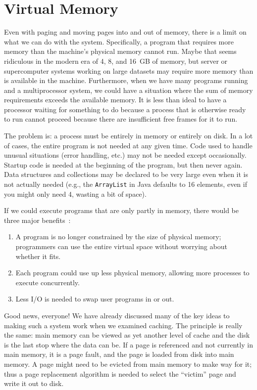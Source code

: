 




\section*{Virtual Memory}
Even with paging and moving pages into and out of memory, there is a limit on what we can do with the system. Specifically, a program that requires more memory than the machine's physical memory cannot run. Maybe that seems ridiculous in the modern era of 4, 8, and 16~GB of memory, but server or supercomputer systems working on large datasets may require more memory than is available in the machine. Furthermore, when we have many programs running and a multiprocessor system, we could have a situation where the sum of memory requirements exceeds the available memory. It is less than ideal to have a processor waiting for something to do because a process that is otherwise ready to run cannot proceed because there are insufficient free frames for it to run.

The problem is: a process must be entirely in memory or entirely on disk. In a lot of cases, the entire program is not needed at any given time. Code used to handle unusual situations (error handling, etc.) may not be needed except occasionally. Startup code is needed at the beginning of the program, but then never again. Data structures and collections may be declared to be very large even when it is not actually needed (e.g., the \texttt{ArrayList} in Java defaults to 16 elements, even if you might only need 4, wasting a bit of space).

If we could execute programs that are only partly in memory, there would be three major benefits~\cite{osc}:

\begin{enumerate}
	\item A program is no longer constrained by the size of physical memory; programmers can use the entire virtual space without worrying about whether it fits.
	\item Each program could use up less physical memory, allowing more processes to execute concurrently.
	\item Less I/O is needed to swap user programs in or out.
\end{enumerate}


Good news, everyone!  We have already discussed many of the key ideas to making such a system work when we examined caching. The principle is really the same: main memory can be viewed as yet another level of cache and the disk is the last stop where the data can be. If a page is referenced and not currently in main memory, it is a page fault, and the page is loaded from disk into main memory. A page might need to be evicted from main memory to make way for it; thus a page replacement algorithm is needed to select the ``victim'' page and write it out to disk. 

